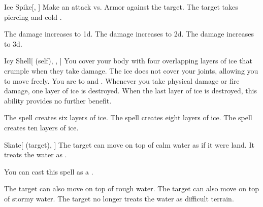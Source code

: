 \lowercase{\hypertarget{spell:Ice Spike}{}}\label{spell:Ice Spike}
\begin{freeability}[Rank 2]{\hypertarget{spell:Ice Spike}{Ice Spike}}[, ]
Make an attack vs. Armor against the target.
\hit The target takes piercing and cold .

\rankline
{} The damage increases to  \plus1d.
 The damage increases to  \plus2d.
 The damage increases to  \plus3d.
\end{freeability}
\vspace{0.25em}



\lowercase{\hypertarget{spell:Icy Shell}{}}\label{spell:Icy Shell}
\begin{attuneability}[Rank 2]{\hypertarget{spell:Icy Shell}{Icy Shell}}[ (self), , ]
You cover your body with four overlapping layers of ice that crumple when they take damage.
The ice does not cover your joints, allowing you to move freely.
You are  to  and .
Whenever you take physical damage or fire damage, one layer of ice is destroyed.
When the last layer of ice is destroyed, this ability provides no further benefit.

\rankline
{} The spell creates six layers of ice.
 The spell creates eight layers of ice.
 The spell creates ten layers of ice.
\end{attuneability}
\vspace{0.25em}



\lowercase{\hypertarget{spell:Skate}{}}\label{spell:Skate}
\begin{attuneability}[Rank 2]{\hypertarget{spell:Skate}{Skate}}[ (target), ]
The target can move on top of calm water as if it were land.
It treats the water as .

You can cast this spell as a .

\rankline
{} The target can also move on top of rough water.
 The target can also move on top of stormy water.
 The target no longer treats the water as difficult terrain.
\end{attuneability}
\vspace{0.25em}



